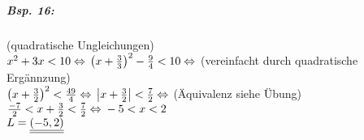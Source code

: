 \subparagraph{Bsp. 16:} (quadratische Ungleichungen)\\
$x^2+3x<10 \Leftrightarrow \\
\left( x+\frac{3}{3}\right)^2-\frac{9}{4}<10 \Leftrightarrow$ (vereinfacht durch quadratische Ergännzung)\\
$\left( x+\frac{3}{2}\right)^2<\frac{49}{4} \Leftrightarrow\\
\left|x+\frac{3}{2}\right|<\frac{7}{2} \Leftrightarrow$ (Äquivalenz siehe Übung) \\
$\frac{-7}{2}<x+\frac{3}{2}<\frac{7}{2} \Leftrightarrow\\
-5<x<2$\\
$L=\underline{\underline{(-5,2)}}$


